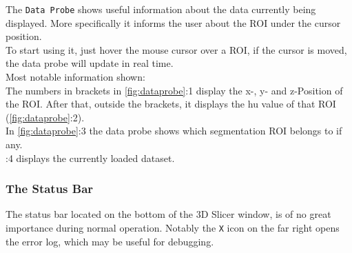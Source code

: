 \noindent
The \texttt{Data Probe} shows useful information about the data currently being displayed. More specifically it informs the user about the ROI under the cursor position.\\
To start using it, just hover the mouse cursor over a ROI, if the cursor is moved, the data probe will update in real time.\\
Most notable information shown:\\
The numbers in brackets in \cref{fig:dataprobe}:1 display the x-, y- and z-Position of the ROI. After that, outside the brackets, it displays the \gls{hu} value of that ROI (\cref{fig:dataprobe}:2).\\
In \cref{fig:dataprobe}:3 the data probe shows which segmentation ROI belongs to if any.\\
:4 displays the currently loaded dataset.

\subsubsection{The Status Bar}
The status bar located on the bottom of the 3D Slicer window, is of no great importance during normal operation. Notably the \texttt{X} icon on the far right opens the error log, which may be useful for debugging.







